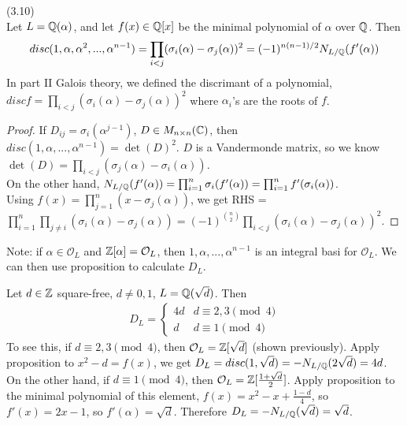 \documentclass[a4paper]{article}
\begin{document}
\begin{prop} (3.10)\\
Let $L=\mathbb{Q}(\alpha)$, and let $f(x) \in \mathbb{Q}[x]$ be the minimal polynomial of $\alpha$ over $\mathbb{Q}$. Then 
\begin{equation*}
\begin{aligned}
disc (1,\alpha,\alpha^2,...,\alpha^{n-1}) = \prod_{i<j} (\sigma_i(\alpha)-\sigma_j(\alpha))^2 = (-1)^{n(n-1)/2} N_{L/\mathbb{Q}}(f'(\alpha))
\end{aligned}
\end{equation*}
In part II Galois theory, we defined the discrimant of a polynomial, $disc f = \prod_{i<j} (\sigma_i(\alpha) - \sigma_j(\alpha))^2$ where $\alpha_i$'s are the roots of $f$.
\begin{proof}
If $D_{ij} = \sigma_i(\alpha^{j-1})$, $D \in M_{n\times n} (\mathbb{C})$, then $disc(1,\alpha,...,\alpha^{n-1}) = \det(D)^2$. $D$ is a Vandermonde matrix, so we know $\det(D) = \prod_{i<j} (\sigma_j(\alpha) - \sigma_i(\alpha))$.\\
On the other hand, $N_{L/\mathbb{Q}} (f'(\alpha)) = \prod_{i=1}^n \sigma_i (f'(\alpha)) = \prod_{i=1}^n f'(\sigma_i(\alpha))$.\\
Using $f(x) = \prod_{j=1}^n (x-\sigma_j(\alpha))$, we get RHS = $\prod_{i=1}^n \prod_{j \neq i} (\sigma_i(\alpha) - \sigma_j(\alpha)) = (-1)^{n \choose 2} \prod_{i < j} (\sigma_i(\alpha) - \sigma_j(\alpha))^2$.
\end{proof}
\end{prop}

Note: if $\alpha \in \mathcal{O}_L$ and $\mathbb{Z}[\alpha] = \mathcal{O}_L$, then $1,\alpha,...,\alpha^{n-1}$ is an integral basi for $\mathcal{O}_L$. We can then use proposition to calculate $D_L$.

\begin{eg}
Let $d\in \mathbb{Z}$ square-free, $d \neq 0,1$, $L = \mathbb{Q}(\sqrt{d})$. Then 
\begin{equation*}
\begin{aligned}
D_L = \left\{\begin{array}{ll}
4d & d \equiv 2,3 \pmod 4\\
d & d \equiv 1 \pmod 4
\end{array}
\right.
\end{aligned}
\end{equation*}
To see this, if $d \equiv 2,3 \pmod 4$, then $\mathcal{O}_L = \mathbb{Z}[\sqrt{d}]$ (shown previously). Apply proposition to $x^2-d = f(x)$, we get $D_L = disc(1,\sqrt{d}) = -N_{L/\mathbb{Q}}(2\sqrt{d}) = 4d$.\\
On the other hand, if $d \equiv 1 \pmod 4$, then $\mathcal{O}_L = \mathbb{Z}[\frac{1+\sqrt{d}}{2}]$. Apply proposition to the minimal polynomial of this element, $f(x) = x^2-x+\frac{1-d}{4}$, so $f'(x) = 2x-1$, so $f'(\alpha) = \sqrt{d}$. Therefore $D_L = -N_{L/\mathbb{Q}}(\sqrt{d}) = \sqrt{d}$.
\end{eg}
\end{document}
